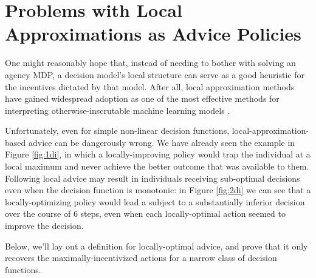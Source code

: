 \section{Problems with Local Approximations as Advice Policies}
\label{sec:linear}

One might reasonably hope that, instead of needing to bother with solving an agency MDP, a decision model's local structure can serve as a good heuristic for the incentives dictated by that model. After all, local approximation methods \cite{ribeiro2016should, baehrens2010explain} have gained widespread adoption as one of the most effective methods for interpreting otherwise-inscrutable machine learning models \cite{lundberg2016unexpected}. 

Unfortunately, even for simple non-linear decision functions, local-approximation-based advice can be dangerously wrong. We have already seen the example in Figure \ref{fig:1di}, in which a locally-improving policy would trap the individual at a local maximum and never achieve the better outcome that was available to them. Following local advice may result in individuals receiving sub-optimal decisions even when the decision function is monotonic: in Figure \ref{fig:2di} we can see that a locally-optimizing policy would lead a subject to a substantially inferior decision over the course of $6$ steps, even when each locally-optimal action seemed to improve the decision.

Below, we'll lay out a definition for locally-optimal advice, and prove that it only recovers the maximally-incentivized actions for a narrow class of decision functions.


